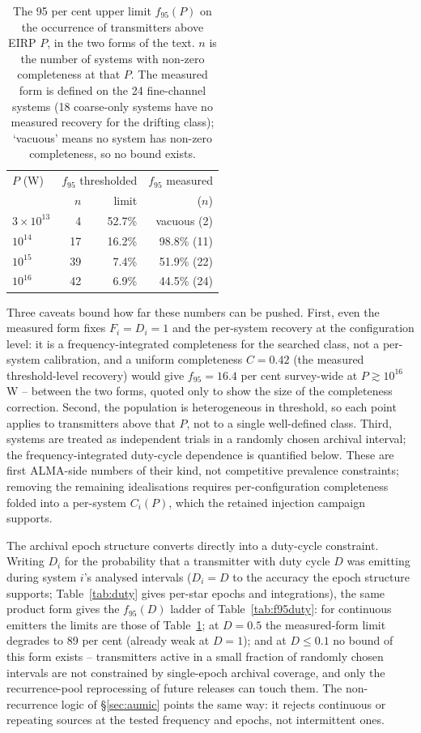 \documentclass{openjournal}
\begin{document}
\begin{table}
\centering
\small
\setlength{\tabcolsep}{4pt}
\caption{The 95 per cent upper limit $f_{95}(P)$ on the occurrence of
transmitters above EIRP $P$, in the two forms of the text. $n$ is the
number of systems with non-zero completeness at that $P$. The
measured form is defined on the 24 fine-channel systems (18
coarse-only systems have no measured recovery for the drifting
class); `vacuous' means no system has non-zero completeness, so no
bound exists.}
\label{tab:occurrence}
\begin{tabular}{@{}lrrr@{}}
\toprule
$P$ (W) & \multicolumn{2}{c}{$f_{95}$ thresholded} & $f_{95}$ measured \\
 & $n$ & limit & ($n$) \\
\midrule
$3\times10^{13}$ & 4 & 52.7\% & vacuous (2) \\
$10^{14}$ & 17 & 16.2\% & 98.8\% (11) \\
$10^{15}$ & 39 & 7.4\% & 51.9\% (22) \\
$10^{16}$ & 42 & 6.9\% & 44.5\% (24) \\
\bottomrule
\end{tabular}
\end{table}

Three caveats bound how far these numbers can be pushed. First, even
the measured form fixes $F_i=D_i=1$ and the per-system recovery at
the configuration level: it is a frequency-integrated completeness
for the searched class, not a per-system calibration, and a uniform
completeness $C=0.42$ (the measured threshold-level recovery) would
give $f_{95}=16.4$ per cent survey-wide at $P\gtrsim10^{16}$\,W --
between the two forms, quoted only to show the size of the
completeness correction. Second, the population is heterogeneous in
threshold, so each point applies to transmitters above that $P$, not
to a single well-defined class. Third, systems are treated as
independent trials in a randomly chosen archival interval; the
frequency-integrated duty-cycle dependence is quantified below. These
are first ALMA-side numbers of their kind, not competitive prevalence
constraints; removing the remaining idealisations requires
per-configuration completeness folded into a per-system $C_i(P)$,
which the retained injection campaign supports.

The archival epoch structure converts directly into a duty-cycle
constraint. Writing $D_i$ for the probability that a transmitter with
duty cycle $D$ was emitting during system $i$'s analysed intervals
($D_i=D$ to the accuracy the epoch structure supports;
Table~\ref{tab:duty} gives per-star epochs and integrations), the
same product form gives the $f_{95}(D)$ ladder of
Table~\ref{tab:f95duty}: for continuous emitters the limits are those
of Table~\ref{tab:occurrence}; at $D=0.5$ the measured-form limit
degrades to 89 per cent (already weak at $D=1$); and at $D\leq0.1$ no
bound of this form exists -- transmitters active in a small fraction
of randomly chosen intervals are not constrained by single-epoch
archival coverage, and only the recurrence-pool reprocessing of
future releases can touch them. The non-recurrence logic of
\S\ref{sec:aumic} points the same way: it rejects continuous or
repeating sources at the tested frequency and epochs, not
intermittent ones.
\end{document}
